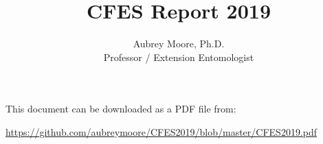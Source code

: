 %



\usepackage[breaklinks=true, colorlinks=True, allcolors=blue]{hyperref}

\usepackage{indentfirst} 
\usepackage{comment}

\newcommand{\activities}{\medskip\textbf{Activities}}
\newcommand{\plans}{\medskip\textbf{Plans}}

\makeatletter

\makeatother




\title{CFES Report 2019}

\author{Aubrey Moore, Ph.D.\\
Professor / Extension Entomologist}

\maketitle

This document can be downloaded as a PDF file from: 

\url{https://github.com/aubreymoore/CFES2019/blob/master/CFES2019.pdf}



\setcounter{tocdepth}{2}
\tableofcontents{}

\clearpage

